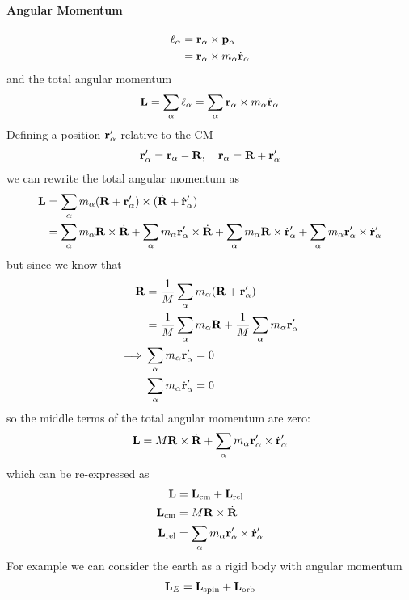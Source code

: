 \documentclass[../main.tex]{subfiles}
\begin{document}
\paragraph*{Angular Momentum}
\begin{align*}
    \vb \ell_\alpha &= \vb r_\alpha \times \vb p_\alpha \\
    &= \vb r_\alpha \times m_\alpha \dot{\vb r}_\alpha
\end{align*}
and the total angular momentum
\begin{align*}
    \vb L = \sum_\alpha \vb \ell_\alpha = \sum_\alpha \vb r_\alpha \times m_\alpha \dot{\vb r}_\alpha
\end{align*}
Defining a position $\vb r_\alpha'$ relative to the CM
\begin{align*}
    \vb r_\alpha' = \vb r_\alpha - \vb R, \quad \vb r_\alpha = \vb R + \vb r_\alpha'
\end{align*}
we can rewrite the total angular momentum as
\begin{align*}
    \vb L &= \sum_\alpha m_\alpha(\vb R + \vb r_\alpha') \times (\dot{\vb R} + \dot{\vb r}_\alpha') \\
    &= \sum_\alpha m_\alpha \vb R \times \dot{\vb R} + \sum_\alpha m_\alpha \vb r_\alpha' \times \dot{\vb R} 
    + \sum_\alpha m_\alpha \vb R \times \dot{\vb r}_\alpha' + \sum_\alpha m_\alpha \vb r_\alpha' \times \dot{\vb r}_\alpha' \\
\end{align*}
but since we know that
\begin{align*}
    \vb R &= \frac{1}{M} \sum_\alpha m_\alpha (\vb R + \vb r_\alpha') \\
    &= \frac{1}{M} \sum_\alpha m_\alpha \vb R + \frac{1}{M} \sum_\alpha m_\alpha \vb r_\alpha' \\
    \implies &\sum_\alpha m_\alpha \vb r_\alpha' = 0 \\
    &\sum_\alpha m_\alpha \dot{\vb r}_\alpha' = 0
\end{align*}
so the middle terms of the total angular momentum are zero:
\begin{align*}
    \vb L = M \vb R \times \dot{\vb R} + \sum_\alpha m_\alpha \vb r_\alpha' \times \dot{\vb r}_\alpha'
\end{align*}
which can be re-expressed as
\begin{align*}
    \vb L &= \vb L_{\text{cm}} + \vb L_{\text{rel}} \\
    \vb L_{\text{cm}} &= M \vb R \times \dot{\vb R} \\
    \vb L_{\text{rel}} &= \sum_\alpha m_\alpha \vb r_\alpha' \times \dot{\vb r}_\alpha'
\end{align*}
For example we can consider the earth as a rigid body with angular momentum
\begin{align*}
    \vb L_E = \vb L_{\text{spin}} + \vb L_{\text{orb}}
\end{align*}
\end{document}
